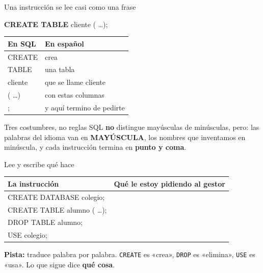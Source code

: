 \documentclass[aspectratio=169,10pt,c]{beamer}
\newcommand{\bl}[1][1.9cm]{\underline{\hspace{#1}}}
\newcommand{\kw}[1]{\textcolor{utpRojo}{\textbf{#1}}}
\newcommand{\ins}[1]{\tikz[baseline=-0.5ex]{\node[rounded corners=2pt,fill=utpRojo,text=white,
  font=\bfseries\scriptsize,inner xsep=5pt,inner ysep=2.5pt] {#1};}}
\newenvironment{sqlcode}[1][.86\textwidth]
  {\begin{center}\begin{lrbox}{\sqlbuf}\begin{minipage}{#1}\ttfamily\footnotesize\vspace{6pt}\raggedright}
  {\vspace{6pt}\end{minipage}\end{lrbox}\colorbox{utpGrisClaro}{\usebox{\sqlbuf}}\end{center}}
\begin{document}
\begin{frame}{Una instrucción se lee casi como una frase}
\begin{sqlcode}[.64\textwidth]
\kw{CREATE TABLE} cliente ( \ldots );
\end{sqlcode}
\vspace{0.2cm}
\begin{center}
\small
\begin{tabular}{>{\ttfamily}l>{\raggedright\arraybackslash}p{6.4cm}}
\toprule
\normalfont\bfseries En SQL & \bfseries En español \\
\midrule
CREATE & crea \\
TABLE & una tabla \\
cliente & que se llame cliente \\
( \ldots ) & con estas columnas \\
; & y aquí termino de pedirte \\
\bottomrule
\end{tabular}
\end{center}
\vspace{0.4cm}
\begin{block}{Tres costumbres, no reglas}
\small SQL \textbf{no} distingue mayúsculas de minúsculas, pero: las palabras del idioma van en \textbf{MAYÚSCULA}, los nombres que inventamos en minúscula, y cada instrucción termina en \textbf{punto y coma}.
\end{block}
\end{frame}

\begin{frame}{\ins{Práctica 1} Lee y escribe qué hace}
\begin{center}
\small
\begin{tabular}{>{\ttfamily}p{5.4cm}>{\raggedright\arraybackslash}p{6.2cm}}
\toprule
\normalfont\bfseries La instrucción & \bfseries Qué le estoy pidiendo al gestor \\
\midrule
CREATE DATABASE colegio; & \bl[5.4cm] \\[9pt]
CREATE TABLE alumno ( \ldots ); & \bl[5.4cm] \\[9pt]
DROP TABLE alumno; & \bl[5.4cm] \\[9pt]
USE colegio; & \bl[5.4cm] \\
\bottomrule
\end{tabular}
\end{center}
\vspace{0.4cm}
\small \textbf{Pista:} traduce palabra por palabra. \texttt{CREATE} es «crea», \texttt{DROP} es «elimina», \texttt{USE} es «usa». Lo que sigue dice \textbf{qué cosa}.
\end{frame}
\end{document}
